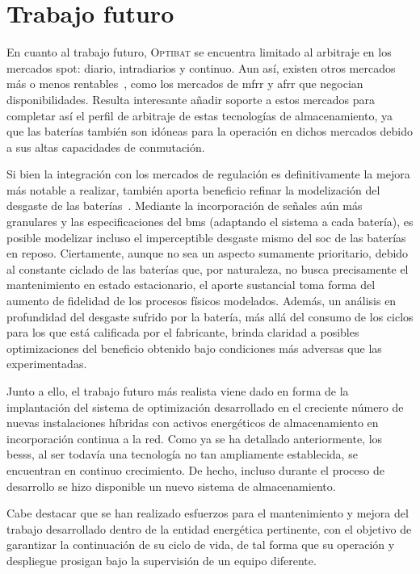 \section{Trabajo futuro}%
\label{makereference8.2}

En cuanto al trabajo futuro, \textsc{Optibat} se encuentra limitado al arbitraje en los mercados spot: diario, intradiarios y continuo. Aun así, existen otros mercados más o menos rentables~\cite{cnmc2024balance}, como los mercados de \gls{mfrr} y \gls{afrr} que negocian disponibilidades. Resulta interesante añadir soporte a estos mercados para completar así el perfil de arbitraje de estas tecnologías de almacenamiento, ya que las baterías también son idóneas para la operación en dichos mercados debido a sus altas capacidades de conmutación.

Si bien la integración con los mercados de regulación es definitivamente la mejora más notable a realizar, también aporta beneficio refinar la modelización del desgaste de las baterías~\cite{shamarova2022review}. Mediante la incorporación de señales aún más granulares y las especificaciones del \gls{bms} (adaptando el sistema a cada batería), es posible modelizar incluso el imperceptible desgaste mismo del \gls{soc} de las baterías en reposo. Ciertamente, aunque no sea un aspecto sumamente prioritario, debido al constante ciclado de las baterías que, por naturaleza, no busca precisamente el mantenimiento en estado estacionario, el aporte sustancial toma forma del aumento de fidelidad de los procesos físicos modelados. Además, un análisis en profundidad del desgaste sufrido por la batería, más allá del consumo de los ciclos para los que está calificada por el fabricante, brinda claridad a posibles optimizaciones del beneficio obtenido bajo condiciones más adversas que las experimentadas.

Junto a ello, el trabajo futuro más realista viene dado en forma de la implantación del sistema de optimización desarrollado en el creciente número de nuevas instalaciones híbridas con activos energéticos de almacenamiento en incorporación continua a la red. Como ya se ha detallado anteriormente, los \glspl{bess}, al ser todavía una tecnología no tan ampliamente establecida, se encuentran en continuo crecimiento. De hecho, incluso durante el proceso de desarrollo se hizo disponible un nuevo sistema de almacenamiento.

Cabe destacar que se han realizado esfuerzos para el mantenimiento y mejora del trabajo desarrollado dentro de la entidad energética pertinente, con el objetivo de garantizar la continuación de su ciclo de vida, de tal forma que su operación y despliegue prosigan bajo la supervisión de un equipo diferente.

